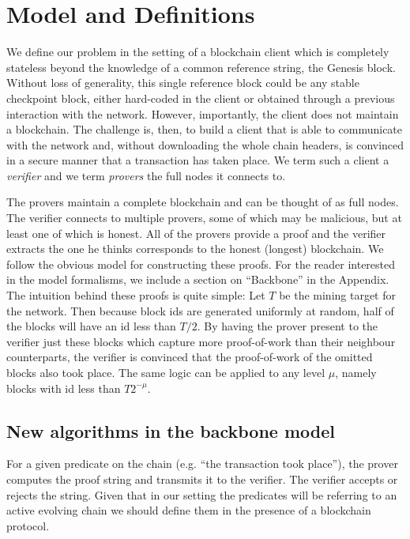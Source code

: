 \section{Model and Definitions}
\label{sec.model}

We define our problem in the setting of a blockchain client which is completely
stateless beyond the knowledge of a common reference string, the Genesis block.
Without loss of generality, this single reference block could be any stable
checkpoint block, either hard-coded in the client or obtained through a previous
interaction with the network. However, importantly, the client does not maintain
a blockchain. The challenge is, then, to build a client that is able to
communicate with the network and, without downloading the whole chain headers,
is convinced in a secure manner that a transaction has taken place. We term such
a client a \textit{verifier} and we term \textit{provers} the full nodes it
connects to.

The provers maintain a complete blockchain and can be thought of as full nodes.
The verifier connects to multiple provers, some of which may be malicious, but
at least one of which is honest. All of the provers provide a proof and the
verifier extracts the one he thinks corresponds to the honest (longest)
blockchain. We follow the obvious model for constructing these proofs. For the
reader interested in the model formalisms, we include a section on ``Backbone''
in the Appendix. The intuition behind these proofs is quite simple: Let $T$ be
the mining target for the network. Then because block ids are generated
uniformly at random, half of the blocks will have an id less than $T / 2$. By
having the prover present to the verifier just these blocks which capture more
proof-of-work than their neighbour counterparts, the verifier is convinced that
the proof-of-work of the omitted blocks also took place. The same logic can be
applied to any level $\mu$, namely blocks with id less than $T 2^{-\mu}$.

\subsection{New algorithms in the backbone model}

For a given predicate on the chain (e.g. ``the transaction took place''), the
prover computes the proof string and transmits it to the verifier. The verifier
accepts or rejects the string. Given that in our setting the predicates will be
referring to an active evolving chain we should define them in the presence of a
blockchain protocol.

